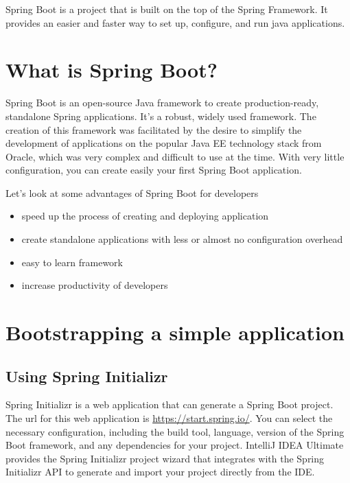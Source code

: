 \documentclass[a4paper, 12pt]{report}
\begin{document}
Spring Boot is a project that is built on the top of the Spring Framework. It provides an easier and faster way to set up, configure, and run java applications.

    
\section{What is Spring Boot?}
 
Spring Boot is an open-source Java framework to create production-ready,  standalone Spring applications. It's a robust, widely used framework. The creation of this framework was facilitated by the desire to simplify the development of applications on the popular Java EE technology stack from Oracle, which was very complex and difficult to use at the time. With very little configuration, you can create easily your first Spring Boot application.

Let's look at some advantages of Spring Boot for developers 
\begin{itemize}
\item speed up the process of creating and deploying application
\item create standalone applications with less or almost no configuration overhead
\item easy to learn framework
\item increase productivity of developers
\end{itemize}

\section{Bootstrapping a simple application}

\subsection{Using Spring Initializr}
Spring Initializr is a web application that can generate a Spring Boot project.
The url for this web application is \url{https://start.spring.io/}. You can select the necessary configuration, including the build tool, language, version of the Spring Boot framework, and any dependencies for your project. IntelliJ IDEA Ultimate provides the Spring Initializr project wizard that integrates with the Spring Initializr API to generate and import your project directly from the IDE.
\end{document}

